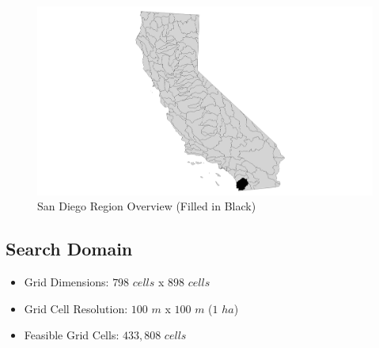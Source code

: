         \begin{figure}[!h]
            \begin{center}
            \includegraphics[width=5.5in]{figures/SanDiego_Overview.png}   
            \caption{San Diego Region Overview (Filled in Black)}
            \label{fig:SDoverview}
            \end{center}
        \end{figure}

    \subsection{Search Domain}
    
    \begin{itemize}
      \setlength{\itemsep}{0cm}
      \setlength{\parskip}{0cm}
        \item Grid Dimensions: $798$ $cells$ x $898$ $cells$
        \item Grid Cell Resolution: $100$ $m$ x $100$ $m$ ($1$ $ha$)
        \item Feasible Grid Cells: $433,808$ $cells$
    \end{itemize}
    
